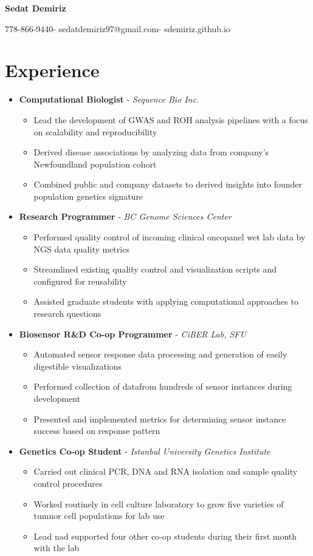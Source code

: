 \documentclass{article}
\makeatletter
\newcommand{\name}{Sedat Demiriz}
\newcommand{\email}{sedatdemiriz97@gmail.com}
\newcommand{\phone}{778-866-9440}
\newcommand{\website}{sdemiriz.github.io}
\newcommand{\customitem}{\item[] \hspace{-.85cm}}
\newcommand{\experienceheader}[2]{\customitem \textbf{#1} - \textit{#2}}
\newcommand{\customsection}[1]{\section*{#1} \vspace{-.3cm} \hrulefill}
\makeatother
\begin{document}
\begin{minipage}[t]{1\textwidth} 
  \centering \Huge 
  \textbf{\name} \vspace{.5cm} 
\end{minipage}
\begin{minipage}[t]{1\textwidth} 
  \centering \normalsize 
  \phone \hspace{.1cm}-\hspace{.1cm} \email \hspace{.1cm}-\hspace{.1cm} \website 
\end{minipage}

\customsection{Experience}
\begin{itemize}
  \experienceheader{Computational Biologist}{Sequence Bio Inc.}
    \begin{itemize}
      \customitem Lead the development of GWAS and ROH analysis pipelines with a focus on scalability and reproducibility
      \customitem Derived disease associations by analyzing data from company's Newfoundland population cohort
      \customitem Combined public and company datasets to derived insights into founder population genetics signature
    \end{itemize}
  \experienceheader{Research Programmer}{BC Genome Sciences Center}
    \begin{itemize}
      \customitem Performed quality control of incoming clinical oncopanel wet lab data by NGS data quality metrics
      \customitem Streamlined existing quality control and visualization scripts and configured for reusability
      \customitem Assisted graduate students with applying computational approaches to research questions
    \end{itemize}
  \experienceheader{Biosensor R\&D Co-op Programmer}{CiBER Lab, SFU}
    \begin{itemize}
      \customitem Automated sensor response data processing and generation of easily digestible visualizations
      \customitem Performed collection of datafrom hundreds of sensor instances during development
      \customitem Presented and implemented metrics for determining sensor instance success based on response pattern
    \end{itemize}
  \experienceheader{Genetics Co-op Student}{Istanbul University Genetics Institute}
    \begin{itemize}
      \customitem Carried out clinical PCR, DNA and RNA isolation and sample quality control procedures
      \customitem Worked routinely in cell culture laboratory to grow five varieties of tumnor cell populations for lab use
      \customitem Lead nad supported four other co-op students during their first month with the lab
    \end{itemize}
\end{itemize}
\end{document}

